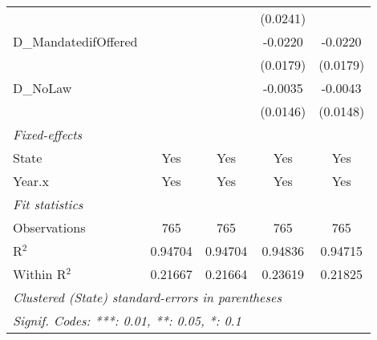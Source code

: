 \begin{table}[htbp]
\begin{tabular}{lcccc}
                               &                         &                         & (0.0241)                &   \\   
      D\_MandatedifOffered     &                         &                         & -0.0220                 & -0.0220\\   
                               &                         &                         & (0.0179)                & (0.0179)\\   
      D\_NoLaw                 &                         &                         & -0.0035                 & -0.0043\\   
                               &                         &                         & (0.0146)                & (0.0148)\\   
      \midrule
      \emph{Fixed-effects}\\
      State                    & Yes                     & Yes                     & Yes                     & Yes\\  
      Year.x                   & Yes                     & Yes                     & Yes                     & Yes\\  
      \midrule
      \emph{Fit statistics}\\
      Observations             & 765                     & 765                     & 765                     & 765\\  
      R$^2$                    & 0.94704                 & 0.94704                 & 0.94836                 & 0.94715\\  
      Within R$^2$             & 0.21667                 & 0.21664                 & 0.23619                 & 0.21825\\  
      \midrule \midrule
      \multicolumn{5}{l}{\emph{Clustered (State) standard-errors in parentheses}}\\
      \multicolumn{5}{l}{\emph{Signif. Codes: ***: 0.01, **: 0.05, *: 0.1}}\\
   \end{tabular}
\end{table}


